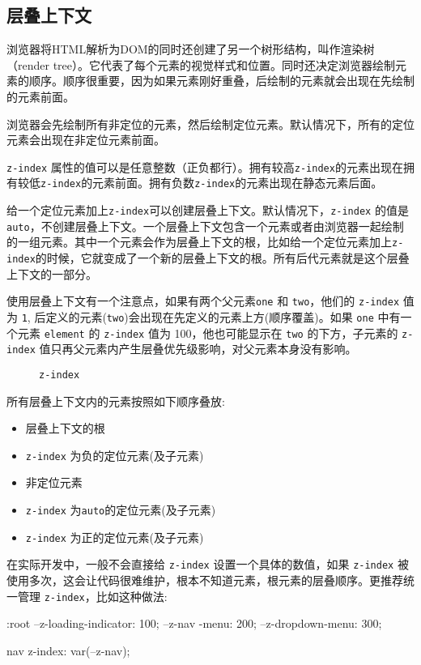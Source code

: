 \subsection{层叠上下文}

浏览器将HTML解析为DOM的同时还创建了另一个树形结构，叫作渲染树（render tree）。它代表了每个元素的视觉样式和位置。同时还决定浏览器绘制元素的顺序。顺序很重要，因为如果元素刚好重叠，后绘制的元素就会出现在先绘制的元素前面。

浏览器会先绘制所有非定位的元素，然后绘制定位元素。默认情况下，所有的定位元素会出现在非定位元素前面。

\texttt{z-index} 属性的值可以是任意整数（正负都行）。拥有较高\texttt{z-index}的元素出现在拥有较低\texttt{z-index}的元素前面。拥有负数\texttt{z-index}的元素出现在静态元素后面。

给一个定位元素加上\texttt{z-index}可以创建层叠上下文。默认情况下，\texttt{z-index} 的值是 \texttt{auto}，不创建层叠上下文。一个层叠上下文包含一个元素或者由浏览器一起绘制的一组元素。其中一个元素会作为层叠上下文的根，比如给一个定位元素加上\texttt{z-index}的时候，它就变成了一个新的层叠上下文的根。所有后代元素就是这个层叠上下文的一部分。

使用层叠上下文有一个注意点，如果有两个父元素\texttt{one} 和 \texttt{two}，他们的 \texttt{z-index} 值为 \texttt{1}, 后定义的元素(\texttt{two})会出现在先定义的元素上方(顺序覆盖)。如果 \texttt{one} 中有一个元素 \texttt{element} 的 \texttt{z-index} 值为 100，他也可能显示在 \texttt{two} 的下方，子元素的 \texttt{z-index} 值只再父元素内产生层叠优先级影响，对父元素本身没有影响。

\begin{figure}[H]
    \small
    \centering
    \caption{\texttt{z-index}}
\end{figure}

所有层叠上下文内的元素按照如下顺序叠放:
\begin{itemize}
    \item 层叠上下文的根
    \item \texttt{z-index} 为负的定位元素(及子元素)
    \item 非定位元素
    \item \texttt{z-index} 为\texttt{auto}的定位元素(及子元素)
    \item \texttt{z-index} 为正的定位元素(及子元素)
\end{itemize}

在实际开发中，一般不会直接给 \texttt{z-index} 设置一个具体的数值，如果 \texttt{z-index} 被使用多次，这会让代码很难维护，根本不知道元素，根元素的层叠顺序。更推荐统一管理 \texttt{z-index}，比如这种做法:

\begin{HTML}
:root {
    --z-loading-indicator:  100;
    --z-nav  -menu:         200;
    --z-dropdown-menu:      300;
}

nav {
    z-index: var(--z-nav);
}
\end{HTML}

\newpage